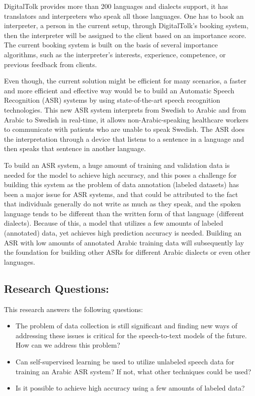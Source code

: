 \documentclass[
  a4paper,
]{article}
\begin{document}
DigitalTolk provides more than 200 languages and dialects support, it
has translators and interpreters who speak all those languages. One has
to book an interpreter, a person in the current setup, through
DigitalTolk's booking system, then the interpreter will be assigned to
the client based on an importance score. The current booking system is
built on the basis of several importance algorithms, such as the
interpreter's interests, experience, competence, or previous feedback
from clients.

Even though, the current solution might be efficient for many scenarios,
a faster and more efficient and effective way would be to build an
Automatic Speech Recognition (ASR) systems by using state-of-the-art
speech recognition technologies. This new ASR system interprets from
Swedish to Arabic and from Arabic to Swedish in real-time, it allows
non-Arabic-speaking healthcare workers to communicate with patients who
are unable to speak Swedish. The ASR does the interpretation through a
device that listens to a sentence in a language and then speaks that
sentence in another language.

To build an ASR system, a huge amount of training and validation data is
needed for the model to achieve high accuracy, and this poses a
challenge for building this system as the problem of data annotation
(labeled datasets) has been a major issue for ASR systems, and that
could be attributed to the fact that individuals generally do not write
as much as they speak, and the spoken language tends to be different
than the written form of that language (different dialects). Because of
this, a model that utilizes a few amounts of labeled (annotated) data,
yet achieves high prediction accuracy is needed. Building an ASR with
low amounts of annotated Arabic training data will subsequently lay the
foundation for building other ASRs for different Arabic dialects or even
other languages.

\hypertarget{research-questions}{%
\subsection{Research Questions:}\label{research-questions}}

This research answers the following questions:

\begin{itemize}
\item
  The problem of data collection is still significant and finding new
  ways of addressing these issues is critical for the speech-to-text
  models of the future. How can we address this problem?
\item
  Can self-supervised learning be used to utilize unlabeled speech data
  for training an Arabic ASR system? If not, what other techniques could
  be used?
\item
  Is it possible to achieve high accuracy using a few amounts of labeled
  data?
\end{itemize}
\end{document}
